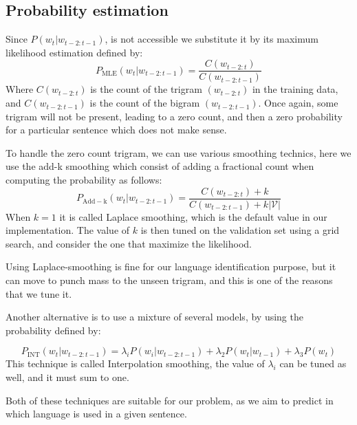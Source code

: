 \subsection{Probability estimation}
Since $P(w_t|w_{t-2:t-1})$, is not accessible we substitute it by its maximum likelihood estimation defined by:
\begin{equation}
    P_{\mathrm{MLE}}(w_t|w_{t-2:t-1}) = \frac{C(w_{t-2:t})}{C(w_{t-2:t-1})}
\end{equation}
Where $C(w_{t-2:t})$ is the count of the trigram $(w_{t-2:t})$ in the training data, and $C(w_{t-2:t-1})$ is the count of the bigram $(w_{t-2:t-1})$. Once again, some trigram will not be present, leading to a zero count, and then a zero probability for a particular sentence which does not make sense.

To handle the zero count trigram, we can use various smoothing technics, here we use the add-k smoothing which consist of adding a fractional count when computing the probability as follows:
    \begin{equation}
        P_{\mathrm{Add-k}}(w_t|w_{t-2:t-1}) = \frac{C(w_{t-2:t})+k}{C(w_{t-2:t-1})+k|\mathcal{V}|}
    \end{equation}
When $k=1$ it is called Laplace smoothing, which is the default value in our implementation. The value of $k$ is then tuned on the validation set using a grid search, and consider the one that maximize the likelihood.

Using Laplace-smoothing is fine for our language identification purpose, but it can move to punch mass to the unseen trigram, and this is one of the reasons that we tune it.

Another alternative is to use a mixture of several models, by using the probability defined by:

\begin{equation}
		P_{\mathrm{INT}}(w_t|w_{t-2:t-1}) =\lambda_iP(w_i|w_{t-2:t-1}) + \lambda_2P(w_t|w_{t-1}) + \lambda_3P(w_t)
\end{equation}
This technique is called Interpolation smoothing, the value of $\lambda_i$ can be tuned as well, and it must sum to one.

Both of these techniques are suitable for our problem, as we aim to predict in which language is used in a given sentence.

